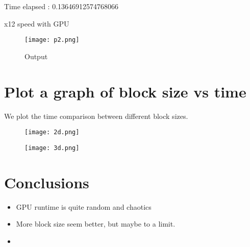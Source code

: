 \documentclass{article}
\begin{document}
Time elapsed :  0.13646912574768066

x12 speed with GPU

\begin{figure}[H]
    \centering
    \texttt{[image: p2.png]}
    \caption{Output}
    \label{fig:enter-label}
\end{figure}


\section{Plot a graph of block size vs time}

We plot the time comparison between different block sizes. 
\begin{figure}[H]
    \centering
    \texttt{[image: 2d.png]}
\end{figure}

\begin{figure}[H]
    \centering
    \texttt{[image: 3d.png]}
\end{figure}

\section{Conclusions}
\begin{itemize}
    \item GPU runtime is quite random and chaotics
    \item More block size seem better, but maybe to a limit.
\end{itemize}


\begin{itemize}
    \item 
\end{itemize}
\end{document}
